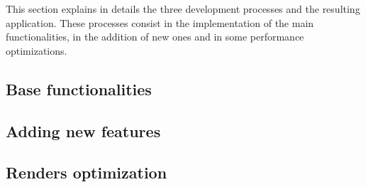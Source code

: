 This section explains in details the three development processes and the resulting application. These processes consist in the implementation of the main functionalities, in the addition of new ones and in some performance optimizations.
\subsection{Base functionalities}
\label{subsec:base_functionalities}


\subsection{Adding new features}
\label{subsec:adding_new_features}


\subsection{Renders optimization}
\label{subsec:renders_optimization}

